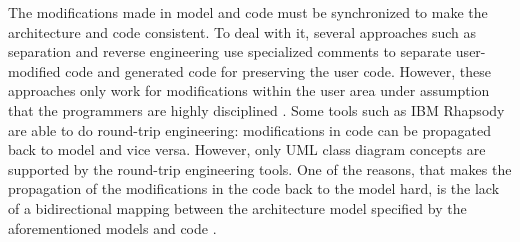 
The modifications made in model and code must be synchronized to make the architecture and code consistent. 
To deal with it, several approaches such as separation \cite{steinberg2008emf} and reverse engineering \cite{ibm_rhapsody} use specialized comments to separate user-modified code and generated code for preserving the user code.
However, these approaches only work for modifications within the user area under assumption that the programmers are highly disciplined \cite{zheng2012enhancing}.
Some tools such as IBM Rhapsody are able to do round-trip engineering: modifications in code can be propagated back to model and vice versa.
However, only UML class diagram concepts are supported by the round-trip engineering tools.
One of the reasons, that makes the propagation of the modifications in the code back to the model hard, is the lack of a bidirectional mapping between the architecture model specified by the aforementioned models and code \cite{ubayashi2010archface}.








